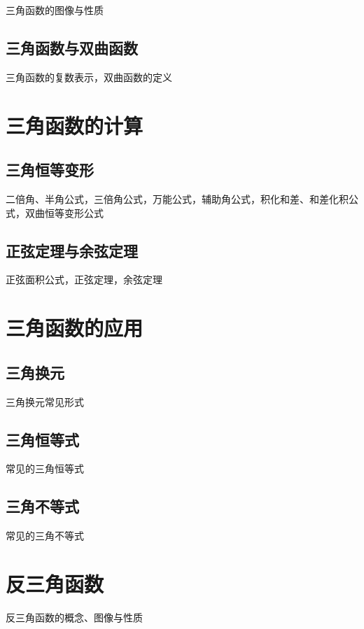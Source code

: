 \documentclass[lang=cn, zihao=4.5]{elegantbook}
\begin{document}
三角函数的图像与性质

\subsection{三角函数与双曲函数}

三角函数的复数表示，双曲函数的定义

\section{三角函数的计算}

\subsection{三角恒等变形}

二倍角、半角公式，三倍角公式，万能公式，辅助角公式，积化和差、和差化积公式，双曲恒等变形公式

\subsection{正弦定理与余弦定理}

正弦面积公式，正弦定理，余弦定理

\section{三角函数的应用}

\subsection{三角换元}

三角换元常见形式

\subsection{三角恒等式}

常见的三角恒等式

\subsection{三角不等式}

常见的三角不等式

\section{反三角函数}

反三角函数的概念、图像与性质
\end{document}

